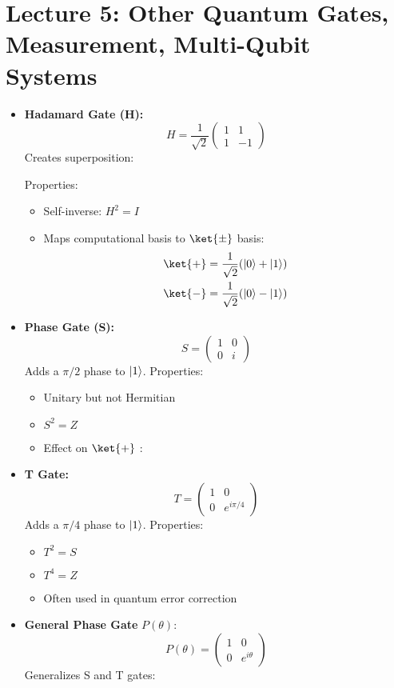 \section{Lecture 5: Other Quantum Gates, Measurement, Multi-Qubit Systems}

\begin{itemize}
    \item \textbf{Hadamard Gate (H):}
    \[
        H = \frac{1}{\sqrt{2}} \begin{pmatrix} 1 & 1 \\ 1 & -1 \end{pmatrix}
    \]
    Creates superposition: 

    Properties:
    \begin{itemize}
        \item Self-inverse: $H^2 = I$
        \item Maps computational basis to $\ket{\pm}$ basis:
        \begin{align*}
            \ket{+} &= \frac{1}{\sqrt{2}}(\zero + \one) \\
            \ket{-} &= \frac{1}{\sqrt{2}}(\zero - \one)
        \end{align*}
    \end{itemize}

    \item \textbf{Phase Gate (S):}
    \[
        S = \begin{pmatrix} 1 & 0 \\ 0 & i \end{pmatrix}
    \]
    Adds a $\pi/2$ phase to $\left|1\right\rangle$. Properties:
    \begin{itemize}
        \item Unitary but not Hermitian
        \item $S^2 = Z$
        \item Effect on $\ket{+}$ : 
    \end{itemize}

    \item \textbf{T Gate:}
    \[
        T = \begin{pmatrix} 1 & 0 \\ 0 & e^{i\pi/4} \end{pmatrix}
    \]
    Adds a $\pi/4$ phase to $\left|1\right\rangle$. Properties:
    \begin{itemize}
        \item $T^2 = S$
        \item $T^4 = Z$
        \item Often used in quantum error correction
    \end{itemize}

    \item \textbf{General Phase Gate } $P(\theta)$:
    \[
        P(\theta) = \begin{pmatrix} 1 & 0 \\ 0 & e^{i\theta} \end{pmatrix}
    \]
    Generalizes S and T gates: 
\end{itemize}

